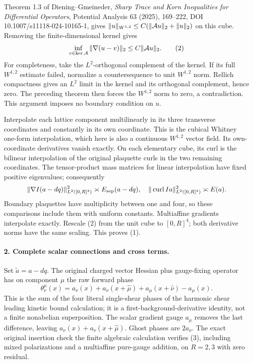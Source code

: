 \documentclass[11pt]{article}
\begin{document}
Theorem 1.3 of Diening--Gmeineder, \emph{Sharp Trace and Korn Inequalities
for Differential Operators}, Potential Analysis 63 (2025), 169--222,
DOI 10.1007/s11118-024-10165-1, gives
$\|u\|_{W^{1,2}}\le C(\|{\cal A}u\|_2+\|u\|_2)$ on this cube.
Removing the finite-dimensional kernel gives
\[
 \inf_{v\in\ker{\cal A}}\|\nabla(u-v)\|_2
                         \le C\|{\cal A}u\|_2.                \tag{2}
\]
For completeness, take the $L^2$-orthogonal complement of the kernel.
If its full $W^{1,2}$ estimate failed, normalize a countersequence to
unit $W^{1,2}$ norm. Rellich compactness gives an $L^2$ limit in the
kernel and its orthogonal complement, hence zero. The preceding
theorem then forces the $W^{1,2}$ norm to zero, a contradiction.
This argument imposes no boundary condition on $u$.

Interpolate each lattice component multilinearly in its three transverse
coordinates and constantly in its own coordinate. This is the cubical
Whitney one-form interpolation, which here is also a continuous
$W^{1,2}$ vector field. Its own-coordinate derivatives vanish exactly.
On each elementary cube, its curl is the bilinear interpolation of
the original plaquette curls in the two remaining coordinates.
The tensor-product mass matrices for linear interpolation have fixed
positive eigenvalues; consequently
\[
 \|\nabla I(a-dq)\|_{L^2([0,R]^4)}^2\asymp E_{\rm sep}(a-dq),
 \quad
 \|\operatorname{curl}Ia\|_{L^2([0,R]^4)}^2\asymp E(a).
\]
Boundary plaquettes have multiplicity between one and four, so these
comparisons include them with uniform constants. Multiaffine gradients
interpolate exactly. Rescale (2) from the unit cube to $[0,R]^4$;
both derivative norms have the same scaling. This proves (1).

\paragraph{2. Complete scalar connections and cross terms.}
Set $\widetilde a=a-dq$. The original charged vector Hessian plus
gauge-fixing operator has on component $\mu$ the raw forward phase
\[
 \theta^\mu_\nu(x)=
 a_\nu(x)+a_\nu(x+\hat\mu)+a_\mu(x+\hat\nu)-a_\mu(x).           \tag{3}
\]
This is the sum of the four literal single-shear phases of the harmonic shear leading kinetic bound calculation;
it is a first-background-derivative identity, not a finite nonabelian
superposition. The scalar gradient gauge $a_\mu$ removes the last
difference, leaving $a_\nu(x)+a_\nu(x+\hat\mu)$. Ghost phases are $2a_\nu$.
The exact original insertion check
the finite algebraic calculation verifies (3),
including mixed polarizations and a multiaffine pure-gauge addition,
on $R=2,3$ with zero residual.
\end{document}
